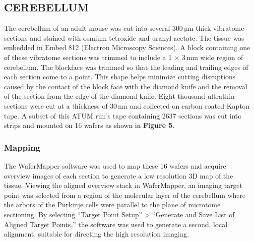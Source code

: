 \documentclass{article}
\begin{document}
\subsection*{CEREBELLUM}

The cerebellum of an adult mouse was cut into several 300\,µm-thick vibratome sections and stained with osmium tetroxide and uranyl acetate. The tissue was embedded in Embed 812 (Electron Microscopy Sciences). A block containing one of these vibratome sections was trimmed to include a 1 × 3\,mm wide region of cerebellum. The blockface was trimmed so that the leading and trailing edges of each section come to a point. This shape helps minimize cutting disruptions caused by the contact of the block face with the diamond knife and the removal of the section from the edge of the diamond knife. Eight thousand ultrathin sections were cut at a thickness of 30\,nm and collected on carbon coated Kapton tape. A subset of this ATUM run’s tape containing 2637 sections was cut into strips and mounted on 16 wafers as shown in \textbf{Figure 5}.

\subsubsection*{Mapping}

The WaferMapper software was used to map these 16 wafers and acquire overview images of each section to generate a low resolution 3D map of the tissue. Viewing the aligned overview stack in WaferMapper, an imaging target point was selected from a region of the molecular layer of the cerebellum where the arbors of the Purkinje cells were parallel to the plane of microtome sectioning. By selecting “Target Point Setup” > “Generate and Save List of Aligned Target Points,” the software was used to generate a second, local alignment, suitable for directing the high resolution imaging.
\end{document}
